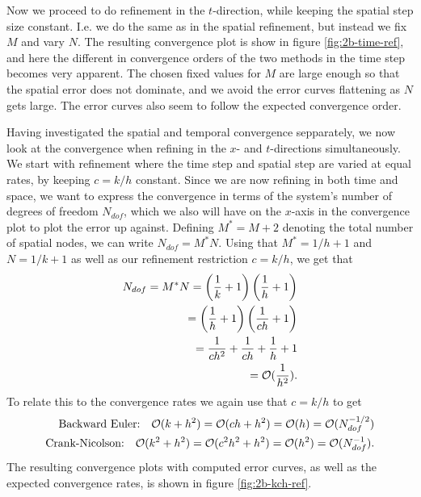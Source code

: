 Now we proceed to do refinement in the $t$-direction, 
while keeping the spatial step size constant. 
I.e. we do the same as in the spatial refinement, 
but instead we fix $M$ and vary $N$. 
The resulting convergence plot is show in figure \ref{fig:2b-time-ref}, 
and here the different in convergence orders of the two methods in the time step becomes very apparent. 
The chosen fixed values for $M$ are large enough so that the spatial error does not dominate, 
and we avoid the error curves flattening as $N$ gets large. 
The error curves also seem to follow the expected convergence order. 

Having investigated the spatial and temporal convergence sepparately, 
we now look at the convergence when refining in the $x$- and $t$-directions simultaneously. 
We start with refinement where the time step and spatial step are varied at equal rates, 
by keeping $c = k/h$ constant. 
Since we are now refining in both time and space, 
we want to express the convergence in terms of the system's number of degrees of freedom $N_{dof}$, 
which we also will have on the $x$-axis in the convergence plot to plot the error up against. 
Defining $M^* = M+2$ denoting the total number of spatial nodes, 
we can write $N_{dof} = M^*N$. 
Using that $M^*=1/h+1$ and $N=1/k+1$ as well as our refinement restriction $c = k/h$, we get that 
\begin{equation*}
\begin{split}
    N_{dof} = M^* N = \left(\frac{1}{k}+1\right)\left(\frac{1}{h}+1\right)
    \\ = \left(\frac{1}{h}+1\right)\left(\frac{1}{ch}+1\right)
    \\ = \frac{1}{ch^2} + \frac{1}{ch} + \frac{1}{h} + 1 
    \\ = \mathcal{O}(\frac{1}{h^2}).
\end{split}
\end{equation*}
To relate this to the convergence rates we again use that $c=k/h$ to get 
\begin{equation*}
\begin{split}
    \text{Backward Euler:} \quad \mathcal{O}(k+h^2) = \mathcal{O}(ch+h^2) = \mathcal{O}(h) = \mathcal{O}(N_{dof}^{-1/2})\\
    \text{Crank-Nicolson:} \quad \mathcal{O}(k^2+h^2) = \mathcal{O}(c^2 h^2+h^2) = \mathcal{O}(h^2) = \mathcal{O}(N_{dof}^{-1}). 
\end{split}
\end{equation*}
The resulting convergence plots with computed error curves, 
as well as the expected convergence rates,
is shown in figure \ref{fig:2b-kch-ref}. 
